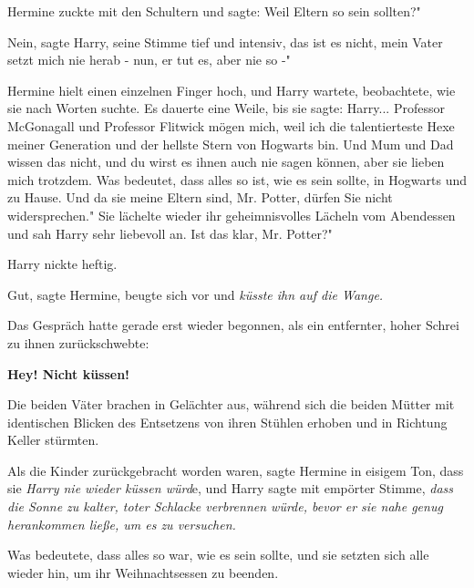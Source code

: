 Hermine zuckte mit den Schultern und sagte: \glqq Weil Eltern so sein sollten?"

\glqq Nein\grqq{}, sagte Harry, seine Stimme tief und intensiv, \glqq das ist es
nicht, mein Vater setzt mich nie herab - nun, er tut es, aber nie so -"

Hermine hielt einen einzelnen Finger hoch, und Harry wartete, beobachtete, wie
sie nach Worten suchte. Es dauerte eine Weile, bis sie sagte: \glqq Harry...
Professor McGonagall und Professor Flitwick mögen mich, weil ich die
talentierteste Hexe meiner Generation und der hellste Stern von Hogwarts bin.
Und Mum und Dad wissen das nicht, und du wirst es ihnen auch nie sagen können,
aber sie lieben mich trotzdem. Was bedeutet, dass alles so ist, wie es sein
sollte, in Hogwarts und zu Hause. Und da sie meine Eltern sind, Mr. Potter,
dürfen Sie nicht widersprechen." Sie lächelte wieder ihr geheimnisvolles Lächeln
vom Abendessen und sah Harry sehr liebevoll an. \glqq Ist das klar, Mr. Potter?"

Harry nickte heftig.

\glqq Gut\grqq{}, sagte Hermine, beugte sich vor und \emph{küsste ihn auf die
Wange.}

Das Gespräch hatte gerade erst wieder begonnen, als ein entfernter, hoher Schrei
zu ihnen zurückschwebte:

\textbf{ \glqq Hey! Nicht küssen!\grqq{} }

Die beiden Väter brachen in Gelächter aus, während sich die beiden Mütter mit
identischen Blicken des Entsetzens von ihren Stühlen erhoben und in Richtung
Keller stürmten.

Als die Kinder zurückgebracht worden waren, sagte Hermine in eisigem Ton, dass
sie \emph{Harry nie wieder küssen würd}e, und Harry sagte mit empörter Stimme,
\emph{dass die Sonne zu kalter, toter Schlacke verbrennen würde, bevor er sie
nahe genug herankommen ließe, um es zu versuchen.}

Was bedeutete, dass alles so war, wie es sein sollte, und sie setzten sich alle
wieder hin, um ihr Weihnachtsessen zu beenden.

